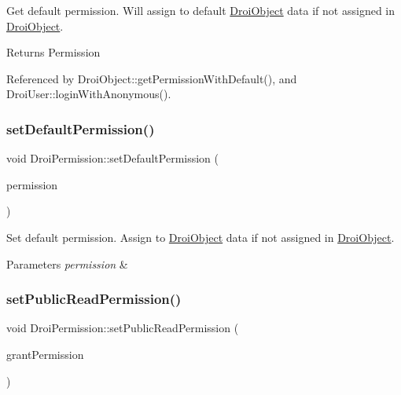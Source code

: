 Get default permission. Will assign to default \hyperlink{class_droi_object}{Droi\+Object} data if not assigned in \hyperlink{class_droi_object}{Droi\+Object}. \begin{DoxyReturn}{Returns}
Permission 
\end{DoxyReturn}


Referenced by Droi\+Object\+::get\+Permission\+With\+Default(), and Droi\+User\+::login\+With\+Anonymous().

\mbox{\label{class_droi_permission_aca711a9a8271b21150e97e75bddd9dbe}} 
\subsubsection{\texorpdfstring{set\+Default\+Permission()}{setDefaultPermission()}}
{\footnotesize\ttfamily void Droi\+Permission\+::set\+Default\+Permission (\begin{DoxyParamCaption}\item[{\hyperlink{class_droi_permission}{Droi\+Permission} $\ast$}]{permission }\end{DoxyParamCaption})\hspace{0.3cm}{\ttfamily [static]}}

Set default permission. Assign to \hyperlink{class_droi_object}{Droi\+Object} data if not assigned in \hyperlink{class_droi_object}{Droi\+Object}. 
\begin{DoxyParams}{Parameters}
{\em permission} & \\
\hline
\end{DoxyParams}
\mbox{\label{class_droi_permission_aa0e05d977d1c3778f26ec65133a3591e}} 
\subsubsection{\texorpdfstring{set\+Public\+Read\+Permission()}{setPublicReadPermission()}}
{\footnotesize\ttfamily void Droi\+Permission\+::set\+Public\+Read\+Permission (\begin{DoxyParamCaption}\item[{bool}]{grant\+Permission }\end{DoxyParamCaption})}

